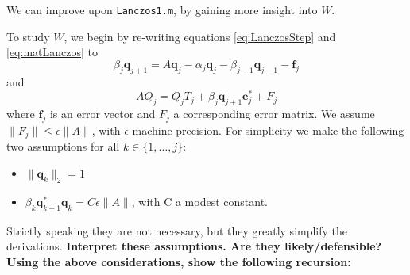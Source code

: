 \documentclass[12pt]{article}
\begin{document}
We can improve upon \texttt{Lanczos1.m}, by gaining more insight into $W$.

To study $W$, we begin by re-writing equations \ref{eq:LanczosStep} and \ref{eq:matLanczos} to
\begin{equation}\label{eq:LanczosErr}
 \beta_j\mathbf{q}_{j+1}=A\mathbf{q}_j-\alpha_j\mathbf{q}_j-\beta_{j-1}\mathbf{q}_{j-1}-\mathbf{f}_j
\end{equation}
and
\begin{equation} \label{eq:matLanczosErr}
 AQ_j=Q_jT_j+\beta_{j}\mathbf{q}_{j+1}\mathbf{e}_j^{\ast}+F_j
\end{equation}
where $\mathbf{f}_j$ is an error vector and $F_j$ a corresponding error matrix. We assume $\|F_j\|\leq\epsilon \|A\|$, with $\epsilon$ machine precision. For simplicity we make the following two assumptions for all $k\in\{1,\ldots,j\}$: 
\begin{itemize}
\item $\|\mathbf{q}_k\|_2=1$
\item $\beta_{k}\mathbf{q}_{k+1}^{\ast}\mathbf{q}_k=C\epsilon\|A\|$, with C a modest constant.
\end{itemize}
Strictly speaking they are not necessary, but they greatly simplify the derivations.
\textbf{Interpret these assumptions. Are they likely/defensible? Using the above considerations, show the following recursion:}
\end{document}
